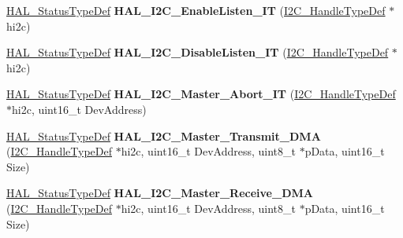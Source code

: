 \begin{DoxyCompactItemize}
\hyperlink{stm32f0xx__hal__def_8h_a63c0679d1cb8b8c684fbb0632743478f}{H\+A\+L\+\_\+\+Status\+Type\+Def} {\bfseries H\+A\+L\+\_\+\+I2\+C\+\_\+\+Enable\+Listen\+\_\+\+IT} (\hyperlink{struct_____i2_c___handle_type_def}{I2\+C\+\_\+\+Handle\+Type\+Def} $\ast$hi2c)
\item 
\mbox{\label{group___i2_c___exported___functions___group2_gafd49a2b08bc6e30989c420a9c679b65e}} 
\hyperlink{stm32f0xx__hal__def_8h_a63c0679d1cb8b8c684fbb0632743478f}{H\+A\+L\+\_\+\+Status\+Type\+Def} {\bfseries H\+A\+L\+\_\+\+I2\+C\+\_\+\+Disable\+Listen\+\_\+\+IT} (\hyperlink{struct_____i2_c___handle_type_def}{I2\+C\+\_\+\+Handle\+Type\+Def} $\ast$hi2c)
\item 
\mbox{\label{group___i2_c___exported___functions___group2_gad001e42b424fc0d85a8e94380b9c7513}} 
\hyperlink{stm32f0xx__hal__def_8h_a63c0679d1cb8b8c684fbb0632743478f}{H\+A\+L\+\_\+\+Status\+Type\+Def} {\bfseries H\+A\+L\+\_\+\+I2\+C\+\_\+\+Master\+\_\+\+Abort\+\_\+\+IT} (\hyperlink{struct_____i2_c___handle_type_def}{I2\+C\+\_\+\+Handle\+Type\+Def} $\ast$hi2c, uint16\+\_\+t Dev\+Address)
\item 
\mbox{\label{group___i2_c___exported___functions___group2_ga978126d41a3a67384f4cb2fe3e6e7e8f}} 
\hyperlink{stm32f0xx__hal__def_8h_a63c0679d1cb8b8c684fbb0632743478f}{H\+A\+L\+\_\+\+Status\+Type\+Def} {\bfseries H\+A\+L\+\_\+\+I2\+C\+\_\+\+Master\+\_\+\+Transmit\+\_\+\+D\+MA} (\hyperlink{struct_____i2_c___handle_type_def}{I2\+C\+\_\+\+Handle\+Type\+Def} $\ast$hi2c, uint16\+\_\+t Dev\+Address, uint8\+\_\+t $\ast$p\+Data, uint16\+\_\+t Size)
\item 
\mbox{\label{group___i2_c___exported___functions___group2_ga299f5e16a92826b9856c60265bc22cf2}} 
\hyperlink{stm32f0xx__hal__def_8h_a63c0679d1cb8b8c684fbb0632743478f}{H\+A\+L\+\_\+\+Status\+Type\+Def} {\bfseries H\+A\+L\+\_\+\+I2\+C\+\_\+\+Master\+\_\+\+Receive\+\_\+\+D\+MA} (\hyperlink{struct_____i2_c___handle_type_def}{I2\+C\+\_\+\+Handle\+Type\+Def} $\ast$hi2c, uint16\+\_\+t Dev\+Address, uint8\+\_\+t $\ast$p\+Data, uint16\+\_\+t Size)
\item 
\mbox{\label{group___i2_c___exported___functions___group2_ga59e69e0da57150f980deea0d235f0397}} 

\end{DoxyCompactItemize}
